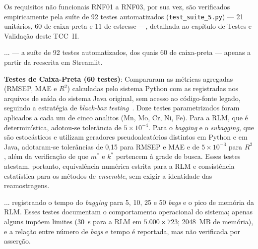 Os requisitos não funcionais RNF01 a RNF03, por sua vez, são verificados
empiricamente pela suíte de 92 testes automatizados
(\texttt{test\_suite\_5.py}) --- 21 unitários, 60 de caixa-preta e 11 de
estresse ---, detalhada no capítulo de Testes e Validação deste TCC~II.


... --- a suíte de 92 testes automatizados, dos quais 60 de caixa-preta ---
apenas a partir da reescrita em Streamlit.


\item[b)] \textbf{Testes de Caixa-Preta (60 testes)}: Compararam as métricas
agregadas (RMSEP, MAE e $R^2$) calculadas pelo sistema Python com as
registradas nos arquivos de saída do sistema Java original, sem acesso ao
código-fonte legado, seguindo a estratégia de \textit{black-box
testing}~\cite{pressman2016}. Doze testes parametrizados foram aplicados a
cada um de cinco analitos (Mn, Mo, Cr, Ni, Fe). Para a RLM, que é
determinística, adotou-se tolerância de $5\times10^{-4}$. Para o
\textit{bagging} e o \textit{subagging}, que são estocásticos e utilizam
geradores pseudoaleatórios distintos em Python e em Java, adotaram-se
tolerâncias de 0,15 para RMSEP e MAE e de $5\times10^{-3}$ para $R^2$, além
da verificação de que $m^*$ e $k^*$ pertencem à grade de busca. Esses testes
atestam, portanto, equivalência numérica estrita para a RLM e consistência
estatística para os métodos de \textit{ensemble}, sem exigir a identidade das
reamostragens.


... registrando o tempo do \textit{bagging} para 5, 10, 25 e 50 \textit{bags}
e o pico de memória da RLM. Esses testes documentam o comportamento
operacional do sistema; apenas alguns impõem limites (30~s para a RLM em
$5.000\times723$; 2048~MB de memória), e a relação entre número de
\textit{bags} e tempo é reportada, mas não verificada por asserção.


